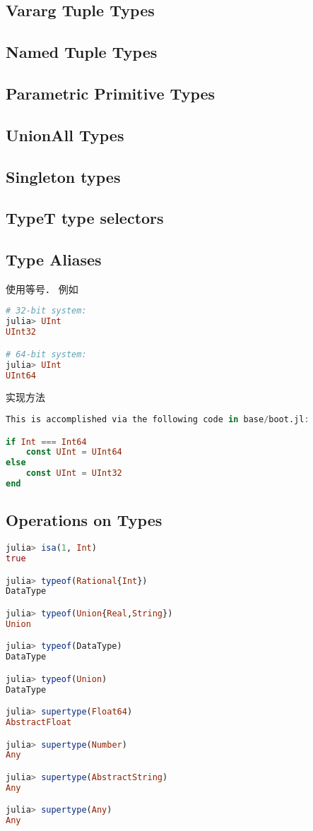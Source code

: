 \subsection{Vararg Tuple Types}

\subsection{Named Tuple Types}

\subsection{Parametric Primitive Types}

\subsection{UnionAll Types}

\subsection{Singleton types}

\subsection{Type{T} type selectors}

\subsection{Type Aliases}
使用等号． 例如
\begin{lstlisting}[language=julia]
# 32-bit system:
julia> UInt
UInt32

# 64-bit system:
julia> UInt
UInt64
\end{lstlisting}
实现方法
\begin{lstlisting}[language=julia]
This is accomplished via the following code in base/boot.jl:

if Int === Int64
    const UInt = UInt64
else
    const UInt = UInt32
end
\end{lstlisting}

\subsection{Operations on Types}
\begin{lstlisting}[language=julia]
julia> isa(1, Int)
true

julia> typeof(Rational{Int})
DataType

julia> typeof(Union{Real,String})
Union

julia> typeof(DataType)
DataType

julia> typeof(Union)
DataType

julia> supertype(Float64)
AbstractFloat

julia> supertype(Number)
Any

julia> supertype(AbstractString)
Any

julia> supertype(Any)
Any
\end{lstlisting}
